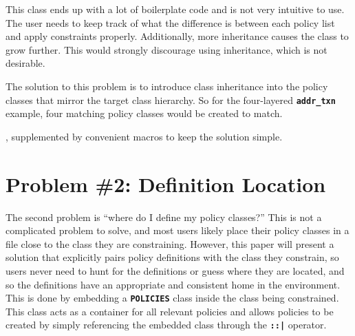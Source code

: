 \documentclass[conference,onecolumn]{IEEEtran}
\newcommand{\code}[1]{
\textbf{\texttt{#1}}
}
\begin{document}
This class ends up with a lot of boilerplate code and is not very intuitive to use. The user needs to keep track of what the difference is between each policy list and apply constraints properly. Additionally, more inheritance causes the class to grow further. This would strongly discourage using inheritance, which is not desirable.

The solution to this problem is to introduce class inheritance into the policy classes that mirror the target class hierarchy. So for the four-layered \code{addr_txn} example, four matching policy classes would be created to match.



, supplemented by convenient macros to keep the solution simple.

\section{Problem \#2: Definition Location}

The second problem is ``where do I define my policy classes?'' This is not a complicated problem to solve, and most users likely place their policy classes in a file close to the class they are constraining. However, this paper will present a solution that explicitly pairs policy definitions with the class they constrain, so users never need to hunt for the definitions or guess where they are located, and so the definitions have an appropriate and consistent home in the environment. This is done by embedding a \code{POLICIES} class inside the class being constrained. This class acts as a container for all relevant policies and allows policies to be created by simply referencing the embedded class through the \code{::|}operator.
\end{document}
